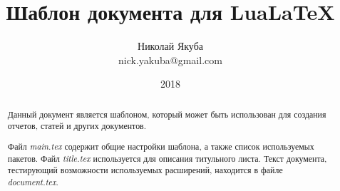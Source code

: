 
\sloppy
{}  %
\clearpage

\title{Шаблон документа для LuaLaTeX}
\author{Николай Якуба\\nick.yakuba@gmail.com}
\date{2018}

\maketitle
\thispagestyle{empty}  %



\cleardoublepage  %

\pagestyle{plain}  %
\setcounter{page}{2}  %

\begin{abstract}
  Данный документ является шаблоном, который может быть использован для создания отчетов, статей и других документов.

  Файл {\em main.tex} содержит общие настройки шаблона, а также список используемых пакетов.
  Файл {\em title.tex} используется для описания титульного листа.
  Текст документа, тестирующий возможности используемых расширений, находится в файле {\em document.tex}.
\end{abstract}

